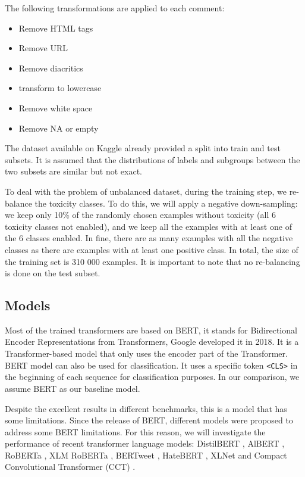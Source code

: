 \documentclass[a4paper,english]{rnti}
\makeatletter
\newcommand\foottotoref[1]{\protected@xdef\@thefnmark{\ref{#1}}\@footnotemark}
\makeatother
\begin{document}
The following transformations are applied to each comment:
\begin{itemize}
    \item Remove HTML tags
    \item Remove URL
    \item Remove diacritics
    \item transform to lowercase
    \item Remove white space
    \item Remove NA or empty
\end{itemize}

The dataset available on Kaggle\foottotoref{civil-comments-data} already provided a split into train and test subsets. It is assumed that the distributions of labels and subgroups between the two subsets are similar but not exact.

To deal with the problem of unbalanced dataset, during the training step, we re-balance the toxicity classes. To do this, we will apply a negative down-sampling: we keep only 10\% of the randomly chosen examples without toxicity (all 6 toxicity classes not enabled), and we keep all the examples with at least one of the 6 classes enabled. In fine, there are as many examples with all the negative classes as there are examples with at least one positive class. In total, the size of the training set is 310 000 examples. It is important to note that no re-balancing is done on the test subset.


\subsection{Models}


Most of the trained transformers are based on BERT,
it stands for Bidirectional Encoder Representations from Transformers, Google developed it in 2018. It is a Transformer-based model that only uses the encoder part of the Transformer. BERT model can also be used for classification. It uses a specific token \texttt{<CLS>} in the
beginning of each sequence for classification purposes. 
In our comparison, we assume BERT as our baseline model. 

Despite the excellent results in different benchmarks, this is a model that has some limitations. 
Since the release of BERT, different models were proposed to address some BERT
limitations. For this reason, we will investigate the performance of recent transformer language models: DistilBERT \citep{39}, AlBERT \citep{38}, RoBERTa \citep{37}, XLM RoBERTa \citep{41}, BERTweet \citep{42}, HateBERT \citep{40}, XLNet \citep{43} and Compact Convolutional Transformer (CCT) \citep{44}.
\end{document}
